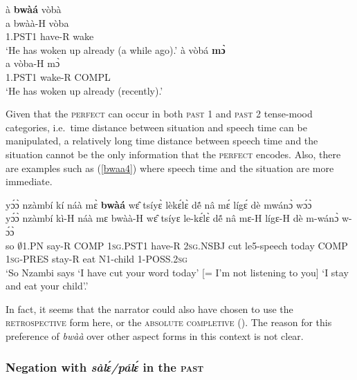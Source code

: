 \begin{exe}  
\ex\label{bwaa3}
\begin{xlist} 
\ex\label{bwaa3a}
  \glll    à {\bfseries bwàá} vòbà \\
            a bwàà-H vòba \\
             1.PST1  have-R wake  \\
    \trans `He has woken up already (a while ago).'
\ex\label{bwaa3b}
  \glll    à vòbá {\bfseries mɔ̀} \\
            a  vòba-H mɔ̀\\
             1.PST1 wake-R COMPL    \\
    \trans `He has woken up already (recently).'
\end{xlist}
\end{exe}

Given that the \textsc{perfect} can occur in both \textsc{past 1} and \textsc{past 2} tense-mood categories, i.e.\ time distance between situation and speech time can be manipulated, a relatively long time distance between speech time and the situation cannot be the only information that the \textsc{perfect} encodes. Also, there are examples such as (\ref{bwaa4}) where speech time and the situation are more immediate. 

\begin{exe} 
\ex\label{bwaa4}
  \glll  yɔ́ɔ̀ nzàmbí kí náà mɛ̀ {\bfseries bwàá} wɛ̂ tsíyɛ̀ lèkɛ́lɛ̀ dẽ́ nâ mɛ́ lígɛ́ dè mwánɔ̀ wɔ́ɔ̀ \\
       yɔ́ɔ̀ nzàmbí kì-H náà mɛ bwàà-H wɛ̂ tsíyɛ le-kɛ́lɛ̀ dẽ́ nâ mɛ-H lígɛ-H dè m-wánɔ̀ w-ɔ́ɔ̀ \\
         so $\emptyset$1.PN say-R COMP 1\textsc{sg}.PST1 have-R 2\textsc{sg}.NSBJ cut le5-speech today COMP 1\textsc{sg}-PRES stay-R eat N1-child 1-POSS.2\textsc{sg}\\
    \trans `So Nzambi says `I have cut your word today' [= I'm not listening to you] `I stay and eat your child'.'
\end{exe}

\noindent In fact, it seems that the narrator could also have chosen to use the \textsc{retrospective} form here, or the \textsc{absolute completive} (). The reason for this preference of {\itshape bwàà} over other aspect forms in this context is not clear. 









\subsubsection{Negation with {\itshape sàlɛ́/pálɛ́} in the \textsc{past}}
\label{sec:NEGPST}

